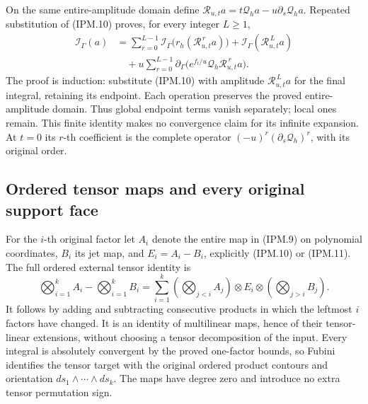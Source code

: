 \documentclass[11pt,a4paper]{article}
\theoremstyle{definition}
\begin{document}
On the same entire-amplitude domain define
\(\mathcal R_{u,t}a=t\mathcal Q_ha-u\partial_s\mathcal Q_ha\).
Repeated substitution of (IPM.10) proves, for every integer \(L\ge1\),
\[
 \begin{aligned}
 \mathcal I_\Gamma(a)
   &=\sum_{r=0}^{L-1}\mathcal I_\Gamma
                 \bigl(r_h(\mathcal R_{u,t}^{\,r}a)\bigr)
      +\mathcal I_\Gamma(\mathcal R_{u,t}^{\,L}a)\\
   &\quad+u\sum_{r=0}^{L-1}\partial_\Gamma
              \bigl(e^{f_t/u}\mathcal Q_h\mathcal R_{u,t}^{\,r}a\bigr).
 \end{aligned}
 \tag{IPM.13}
\]
The proof is induction: substitute (IPM.10) with amplitude
\(\mathcal R_{u,t}^{\,L}a\) for the final integral, retaining its
endpoint. Each operation preserves the proved entire-amplitude domain.
Thus global endpoint terms vanish separately; local ones remain. This
finite identity makes no convergence claim for its infinite expansion.
At \(t=0\) its \(r\)-th coefficient is the complete operator
\((-u)^r(\partial_s\mathcal Q_h)^r\), with its original order.

\subsection{Ordered tensor maps and every original support face}

For the \(i\)-th original factor let \(A_i\) denote the entire map
in (IPM.9) on polynomial coordinates, \(B_i\) its jet map, and
\(E_i=A_i-B_i\), explicitly (IPM.10) or (IPM.11). The full ordered
external tensor identity is
\[
 \bigotimes_{i=1}^kA_i-\bigotimes_{i=1}^kB_i
 =\sum_{i=1}^k
     \left(\bigotimes_{j<i}A_j\right)\otimes E_i\otimes
     \left(\bigotimes_{j>i}B_j\right).
 \tag{IPM.14}
\]
It follows by adding and subtracting consecutive products in which the
leftmost \(i\) factors have changed. It is an identity of multilinear
maps, hence of their tensor-linear extensions, without choosing a tensor
decomposition of the input. Every integral is absolutely convergent by
the proved one-factor bounds, so Fubini identifies the tensor target
with the original ordered product contours and orientation
\(ds_1\wedge\cdots\wedge ds_k\). The maps have degree zero and
introduce no extra tensor permutation sign.
\end{document}
